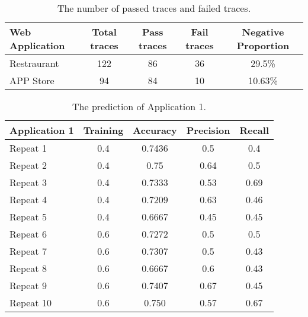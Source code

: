 \begin{table}[ht]
	\begin{center}
		\begin{tabular}{ | l | c | c | c | c | }%
			\hline%
			Web Application & Total traces & Pass traces & Fail traces &  Negative Proportion \\ \hline
			Restraurant & 122 & 86 & 36 & 29.5\% \\ \hline
			APP Store & 94 & 84 & 10 & 10.63\% \\ \hline
		\end{tabular}
		\caption{ The number of passed traces and failed traces. }
		\label{WebtracesProporiton}
	\end{center}
\end{table}


\begin{table}[ht]
	\begin{center}
		\begin{tabular}{ | l | c | c | c | c | }
			\hline
			Application 1 & Training & Accuracy & Precision & Recall \\ \hline
			Repeat 1 & 0.4 & 0.7436 & 0.5  & 0.4  \\ \hline
			Repeat 2 & 0.4 & 0.75   & 0.64 & 0.5  \\ \hline
			Repeat 3 & 0.4 & 0.7333 & 0.53 & 0.69 \\ \hline
			Repeat 4 & 0.4 & 0.7209 & 0.63 & 0.46 \\ \hline
			Repeat 5 & 0.4 & 0.6667 & 0.45 & 0.45 \\ \hline
			Repeat 6 & 0.6 & 0.7272 & 0.5  & 0.5  \\ \hline
			Repeat 7 & 0.6 & 0.7307 & 0.5  & 0.43 \\ \hline
			Repeat 8 & 0.6 & 0.6667 & 0.6  & 0.43 \\ \hline
			Repeat 9 & 0.6 & 0.7407 & 0.67 & 0.45 \\ \hline
			Repeat 10& 0.6 & 0.750  & 0.57 & 0.67 \\ \hline
		\end{tabular}
		\caption{ The prediction of Application 1. }
		\label{PredictResult}
	\end{center}
\end{table}

